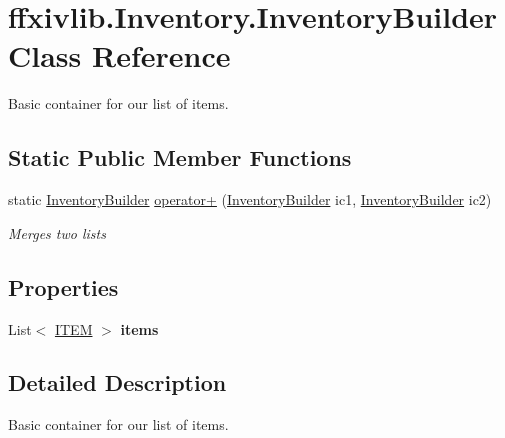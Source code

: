 \hypertarget{classffxivlib_1_1_inventory_1_1_inventory_builder}{\section{ffxivlib.\-Inventory.\-Inventory\-Builder Class Reference}
\label{classffxivlib_1_1_inventory_1_1_inventory_builder}
}


Basic container for our list of items.  


\subsection*{Static Public Member Functions}
\begin{DoxyCompactItemize}
\item 
static \hyperlink{classffxivlib_1_1_inventory_1_1_inventory_builder}{Inventory\-Builder} \hyperlink{classffxivlib_1_1_inventory_1_1_inventory_builder_abe01b1e7492bea9cf2e49095ebab1f1f}{operator+} (\hyperlink{classffxivlib_1_1_inventory_1_1_inventory_builder}{Inventory\-Builder} ic1, \hyperlink{classffxivlib_1_1_inventory_1_1_inventory_builder}{Inventory\-Builder} ic2)
\begin{DoxyCompactList}\small\item\em Merges two lists \end{DoxyCompactList}\end{DoxyCompactItemize}
\subsection*{Properties}
\begin{DoxyCompactItemize}
\item 
\hypertarget{classffxivlib_1_1_inventory_1_1_inventory_builder_ae0ddf09c1850429bbbe62ee98eb8f4d8}{List$<$ \hyperlink{structffxivlib_1_1_inventory_1_1_i_t_e_m}{I\-T\-E\-M} $>$ {\bfseries items}}\label{classffxivlib_1_1_inventory_1_1_inventory_builder_ae0ddf09c1850429bbbe62ee98eb8f4d8}

\end{DoxyCompactItemize}


\subsection{Detailed Description}
Basic container for our list of items. 



